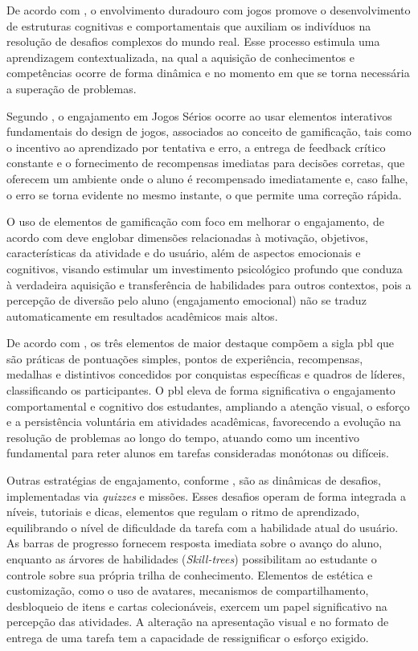 De acordo com \cite{michael2006seriousgame}, o envolvimento duradouro com jogos
promove o desenvolvimento de estruturas cognitivas e comportamentais que
auxiliam os indivíduos na resolução de desafios complexos do mundo real. Esse
processo estimula uma aprendizagem contextualizada, na qual a aquisição de
conhecimentos e competências ocorre de forma dinâmica e no momento em que se
torna necessária a superação de problemas.


\newpage{}


Segundo \cite{michael2006seriousgame}, o engajamento em Jogos Sérios ocorre ao
usar elementos interativos fundamentais do design de jogos, associados ao
conceito de gamificação, tais como o incentivo ao aprendizado por tentativa e
erro, a entrega de feedback crítico constante e o fornecimento de recompensas
imediatas para decisões corretas, que oferecem um ambiente onde o aluno é
recompensado imediatamente e, caso falhe, o erro se torna
evidente no mesmo instante, o que permite uma correção
rápida.


O uso de elementos de gamificação com foco em melhorar o engajamento, de acordo
com  \cite{silpasuwanchai2016developing} deve englobar dimensões relacionadas à
motivação, objetivos, características da atividade e do usuário, além de
aspectos emocionais e cognitivos, visando estimular um investimento psicológico
profundo que conduza à verdadeira aquisição e transferência de habilidades para
outros contextos, pois a percepção de diversão pelo aluno (engajamento
emocional) não se traduz automaticamente em resultados acadêmicos mais altos.


De acordo com \cite{silpasuwanchai2016developing}, os três elementos de maior
destaque compõem a sigla \gls{pbl} que são práticas
de pontuações simples, pontos de experiência, recompensas, medalhas e
distintivos concedidos por conquistas específicas e quadros de líderes,
classificando os participantes. O \gls{pbl} eleva de forma significativa o engajamento
comportamental e cognitivo dos estudantes, ampliando a atenção visual, o esforço
e a persistência voluntária em atividades acadêmicas, favorecendo a evolução na
resolução de problemas ao longo do tempo, atuando como um incentivo fundamental
para reter alunos em tarefas consideradas monótonas ou difíceis.


Outras estratégias de engajamento, conforme \cite{silpasuwanchai2016developing},
são as dinâmicas de desafios, implementadas via \textit{quizzes} e missões.
Esses desafios operam de forma integrada a níveis, tutoriais e dicas, elementos
que regulam o ritmo de aprendizado, equilibrando o nível de dificuldade da
tarefa com a habilidade atual do usuário. As barras de progresso fornecem
resposta imediata sobre o avanço do aluno, enquanto as árvores de habilidades
(\textit{Skill-trees}) possibilitam ao estudante o controle sobre sua própria
trilha de conhecimento. Elementos de estética e customização, como o uso de
avatares, mecanismos de compartilhamento, desbloqueio de itens e cartas
colecionáveis, exercem um papel significativo na percepção das atividades. A
alteração na apresentação visual e no formato de entrega de uma tarefa tem a
capacidade de ressignificar o esforço exigido.


